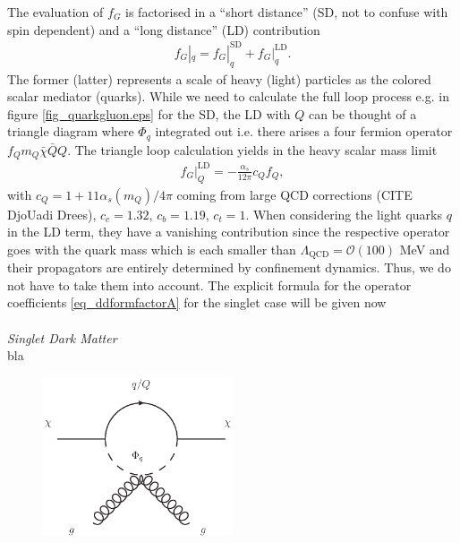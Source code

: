 \noindent The evaluation of $f_G$ is factorised in a ``short distance'' (SD, not to confuse with spin dependent) and a ``long distance'' (LD) 
contribution
\begin{align}
 f_G|_q = f_G|^\text{SD}_q + f_G|^\text{LD}_q. 
\end{align}
The former (latter) represents a scale of heavy (light) particles as the colored scalar mediator (quarks). While we need to calculate the full
loop process e.g. in figure \ref{fig_quarkgluon.eps} for the SD, the LD with $Q$ can be thought of a triangle diagram where $\Phi_q$ integrated 
out i.e. there arises a four fermion operator $f_Q m_Q \bar \chi \bar Q Q$. The triangle loop calculation yields in the heavy scalar mass limit 
\begin{align}
 f_G|_Q^\text{LD} = -\frac{\alpha_s}{12\pi} c_Q f_Q,
\end{align}
with $c_Q = 1+11\alpha_s(m_Q)/4\pi$ coming from large QCD corrections (CITE DjoUadi Drees), $c_c=1.32$, $c_b = 1.19$, $c_t = 1$.
When considering the light quarks $q$ in the LD term, they have a vanishing contribution since the respective operator goes with the quark mass
which is each smaller than $\Lambda_\text{QCD} = \mathcal{O}(100)$ MeV and their propagators are entirely determined by confinement dynamics. Thus,
we do not have to take them into account. The explicit formula for the operator coefficients \eqref{eq_ddformfactorA} for the singlet case 
will be given now
\\ \\ \textit{Singlet Dark Matter}\\
bla



\begin{figure}[t]
 \includegraphics[width=0.5\textwidth]{../pics/phigluon.eps}
\end{figure}


